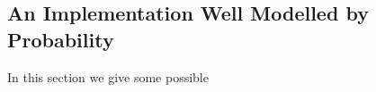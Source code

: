 

	\subsection{An Implementation Well Modelled by Probability}
	\label{ss:r_prob1}
	In this section we give some possible 
	
